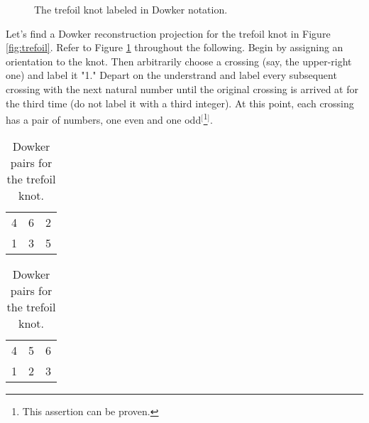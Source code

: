 \documentclass[titlepage]{article}
\begin{document}
\begin{figure}[h!]
    \centering
    \vspace{-2.3em}
    \caption{The trefoil knot labeled in Dowker notation.}
    \label{fig:trefoilDowker}
\end{figure}

Let's find a Dowker reconstruction projection for the trefoil knot in Figure \ref{fig:trefoil}. Refer to Figure \ref{fig:trefoilDowker} throughout the following. Begin by assigning an orientation to the knot. Then arbitrarily choose a crossing (say, the upper-right one) and label it "1." Depart on the understrand and label every subsequent crossing with the next natural number until the original crossing is arrived at for the third time (do not label it with a third integer). At this point, each crossing has a pair of numbers, one even and one odd$^[$\footnote{This assertion can be proven.}$^]$.\par\par

\begin{table}[h!]
    \centering
    \begin{subtable}[b]{0.3\linewidth}
        \centering
        \begin{tabular}{ccc}
            4 & 6 & 2\\
            1 & 3 & 5
        \end{tabular}
        \caption{Dowker pairing.}
        \label{tab:trefoilDowkera}
    \end{subtable}
    \begin{subtable}[b]{0.3\linewidth}
        \centering
        \begin{tabular}{ccc}
            4 & 5 & 6\\
            1 & 2 & 3
        \end{tabular}
        \caption{Reconstruction pairing.}
        \label{tab:trefoilDowkerb}
    \end{subtable}
    \caption{Dowker pairs for the trefoil knot.}
    \label{tab:trefoilDowker}
\end{table}
\end{document}
